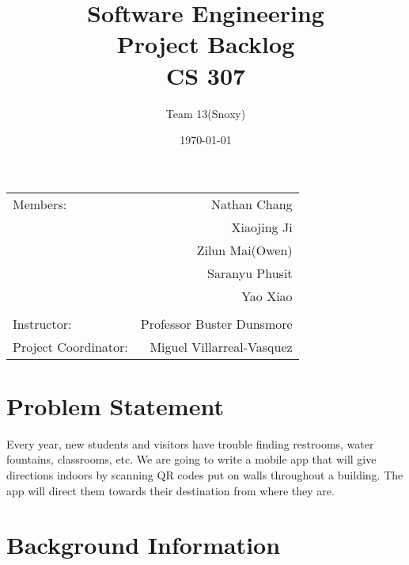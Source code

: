 \documentclass[12pt]{article}
\title{Software Engineering \\ Project Backlog \\ CS 307} %
\author{Team \textsc{13}(Snoxy)} %
\date{\today} %
\begin{document}
\maketitle %

\begin{center}
\begin{tabular}{l r}
Members: & Nathan Chang \\ %
& Xiaojing Ji \\
& Zilun Mai(Owen) \\
& Saranyu Phusit \\
& Yao Xiao \\
\\



Instructor: & Professor Buster Dunsmore \\%
Project Coordinator: & Miguel Villarreal-Vasquez %

\end{tabular}
\end{center}




\newpage
\section{Problem Statement}

Every year, new students and visitors have trouble finding restrooms, water fountains, classrooms, etc. We are going to write a mobile app that will give directions indoors by scanning QR codes put on walls throughout a building. The app will direct them towards their destination from where they are.


\section{Background Information}
\end{document}
